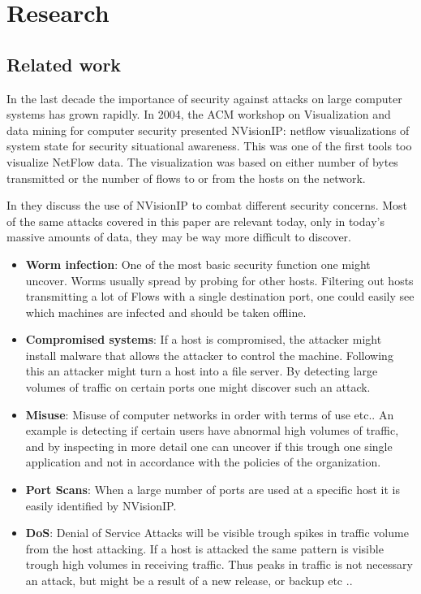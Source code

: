 \chapter{Research}
\label{chp:research} 

\section{Related work}
In the last decade the importance of security against attacks on large computer systems has grown rapidly. In 2004, the ACM workshop on Visualization and data mining for computer security presented NVisionIP: netflow visualizations of system state for security situational awareness\cite{nvisionip}. This was one of the first tools too visualize NetFlow data. The visualization was based on either number of bytes transmitted or the number of flows to or from the hosts on the network. 

In \cite{nvisionip_list} they discuss the use of NVisionIP to combat different security concerns. Most of the same attacks covered in this paper are relevant today, only in today's massive amounts of data, they may be way more difficult to discover. 

\begin{itemize}
\item \textbf{Worm infection}: One of the most basic security function one might uncover.  Worms usually spread by probing for other hosts. Filtering out hosts transmitting a lot of Flows with a single destination port, one could easily see which machines are infected and should be taken offline. 
\item \textbf{Compromised systems}: If a host is compromised, the attacker might install malware that allows the attacker to control the machine. Following this an attacker might turn a host into a file server. By detecting large volumes of traffic on certain ports one might discover such an attack. 
\item \textbf{Misuse}: Misuse of computer networks in order with terms of use etc.. An example is detecting if certain users have abnormal high volumes of traffic, and by inspecting in more detail one can uncover if this trough one single application and not in accordance with the policies of the organization. 
\item \textbf{Port Scans}: When a large number of ports are used at a specific host it is easily identified by NVisionIP.
\item \textbf{DoS}: Denial of Service Attacks will be visible trough spikes in traffic volume from the host attacking. If a host is attacked the same pattern is visible trough high volumes in receiving traffic. Thus peaks in traffic is not necessary an attack, but might be a result of a new release, or backup etc .. 
\end{itemize}

